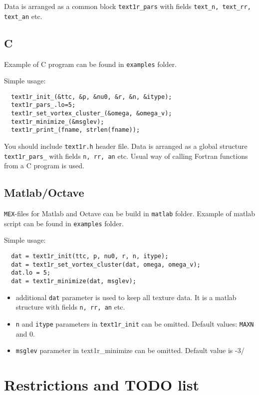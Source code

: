\documentclass[a4paper]{article}
\begin{document}
Data is arranged as a common block {\tt text1r\_pars} with
fields {\tt text\_n, text\_rr, text\_an} etc.

\subsection*{C}
Example of C program can be found in {\tt examples} folder.

Simple usage:
\begin{verbatim}
  text1r_init_(&ttc, &p, &nu0, &r, &n, &itype);
  text1r_pars_.lo=5;
  text1r_set_vortex_cluster_(&omega, &omega_v);
  text1r_minimize_(&msglev);
  text1r_print_(fname, strlen(fname));
\end{verbatim}

You should include {\tt text1r.h} header file. Data is arranged as a
global structure {\tt text1r\_pars\_} with fields {\tt n, rr, an} etc. Usual
way of calling Fortran functions from a C program is used.

\subsection*{Matlab/Octave}
{\tt MEX}-files for Matlab and Octave can be build in {\tt matlab} folder.
Example of matlab script can be found in {\tt examples} folder.

Simple usage:
\begin{verbatim}
  dat = text1r_init(ttc, p, nu0, r, n, itype);
  dat = text1r_set_vortex_cluster(dat, omega, omega_v);
  dat.lo = 5;
  dat = text1r_minimize(dat, msglev);
\end{verbatim}

\begin{itemize}
\item additional {\tt dat} parameter is used to keep all texture data. It
is a matlab structure with fields {\tt n, rr, an} etc.

\item {\tt n} and {\tt itype} parameters in {\tt text1r\_init} can be omitted.
Default values: {\tt MAXN} and 0.

\item {\tt msglev} parameter in {text1r\_minimize} can be omitted.
Default value is -3/

\end{itemize}


\section*{Restrictions and TODO list}
\end{document}

